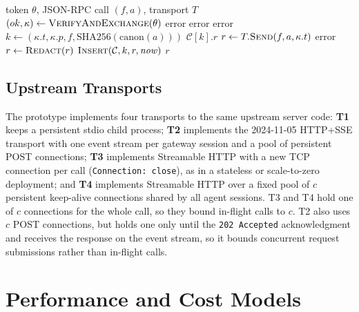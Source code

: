 \documentclass{ieeeaccess}
\begin{document}
\begin{algorithm}[t]
\caption{Gateway request pipeline}
\label{alg:pipeline}
\begin{algorithmic}[1]
\REQUIRE token $\theta$, JSON-RPC call $(f, a)$, transport $T$
\STATE $(ok, \kappa) \gets \textsc{VerifyAndExchange}(\theta)$ 
 \RETURN error \ENDIF
{} \RETURN error  \ENDIF
{} \RETURN error  \ENDIF
\STATE $k \gets (\kappa.t, \kappa.p, f, \mathrm{SHA256}(\mathrm{canon}(a)))$ 
 \RETURN $\mathcal{C}[k].r$ \ENDIF
\STATE $r \gets T.\textsc{Send}(f, a, \kappa.t)$
 \RETURN error  \ENDIF
\STATE $r \gets \textsc{Redact}(r)$
 \STATE $\textsc{Insert}(\mathcal{C}, k, r, \mathit{now})$  \ENDIF
\RETURN $r$
\end{algorithmic}
\end{algorithm}

\subsection{Upstream Transports}
The prototype implements four transports to the same upstream server code: \textbf{T1} keeps a persistent stdio child process; \textbf{T2} implements the 2024-11-05 HTTP+SSE transport with one event stream per gateway session and a pool of persistent POST connections; \textbf{T3} implements Streamable HTTP with a new TCP connection per call (\texttt{Connection: close}), as in a stateless or scale-to-zero deployment; and \textbf{T4} implements Streamable HTTP over a fixed pool of $c$ persistent keep-alive connections shared by all agent sessions. T3 and T4 hold one of $c$ connections for the whole call, so they bound in-flight calls to $c$. T2 also uses $c$ POST connections, but holds one only until the \texttt{202 Accepted} acknowledgment and receives the response on the event stream, so it bounds concurrent request submissions rather than in-flight calls.

\section{Performance and Cost Models}
\label{sec:model}
\end{document}
